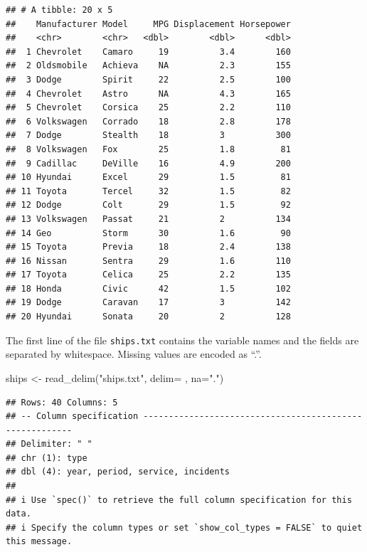 \documentclass[
]{book}
\newenvironment{Shaded}{\begin{snugshade}}{\end{snugshade}}
\newcommand{\AttributeTok}[1]{\textcolor[rgb]{0.77,0.63,0.00}{#1}}
\newcommand{\FunctionTok}[1]{\textcolor[rgb]{0.00,0.00,0.00}{#1}}
\newcommand{\NormalTok}[1]{#1}
\newcommand{\OtherTok}[1]{\textcolor[rgb]{0.56,0.35,0.01}{#1}}
\newcommand{\StringTok}[1]{\textcolor[rgb]{0.31,0.60,0.02}{#1}}
\begin{document}
\begin{verbatim}
## # A tibble: 20 x 5
##    Manufacturer Model     MPG Displacement Horsepower
##    <chr>        <chr>   <dbl>        <dbl>      <dbl>
##  1 Chevrolet    Camaro     19          3.4        160
##  2 Oldsmobile   Achieva    NA          2.3        155
##  3 Dodge        Spirit     22          2.5        100
##  4 Chevrolet    Astro      NA          4.3        165
##  5 Chevrolet    Corsica    25          2.2        110
##  6 Volkswagen   Corrado    18          2.8        178
##  7 Dodge        Stealth    18          3          300
##  8 Volkswagen   Fox        25          1.8         81
##  9 Cadillac     DeVille    16          4.9        200
## 10 Hyundai      Excel      29          1.5         81
## 11 Toyota       Tercel     32          1.5         82
## 12 Dodge        Colt       29          1.5         92
## 13 Volkswagen   Passat     21          2          134
## 14 Geo          Storm      30          1.6         90
## 15 Toyota       Previa     18          2.4        138
## 16 Nissan       Sentra     29          1.6        110
## 17 Toyota       Celica     25          2.2        135
## 18 Honda        Civic      42          1.5        102
## 19 Dodge        Caravan    17          3          142
## 20 Hyundai      Sonata     20          2          128
\end{verbatim}

The first line of the file \texttt{ships.txt} contains the variable names and the fields are separated by whitespace. Missing values are encoded as ``.''.

\begin{Shaded}
\begin{Highlighting}[]
\NormalTok{ships }\OtherTok{\textless{}{-}} \FunctionTok{read\_delim}\NormalTok{(}\StringTok{"ships.txt"}\NormalTok{, }\AttributeTok{delim=}\StringTok{\textquotesingle{} \textquotesingle{}}\NormalTok{ , }\AttributeTok{na=}\StringTok{"."}\NormalTok{)}
\end{Highlighting}
\end{Shaded}

\begin{verbatim}
## Rows: 40 Columns: 5
## -- Column specification --------------------------------------------------------
## Delimiter: " "
## chr (1): type
## dbl (4): year, period, service, incidents
## 
## i Use `spec()` to retrieve the full column specification for this data.
## i Specify the column types or set `show_col_types = FALSE` to quiet this message.
\end{verbatim}
\end{document}
